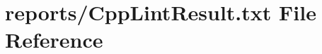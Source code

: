 \hypertarget{CppLintResult_8txt}{}\section{reports/\+Cpp\+Lint\+Result.txt File Reference}
\label{CppLintResult_8txt}
